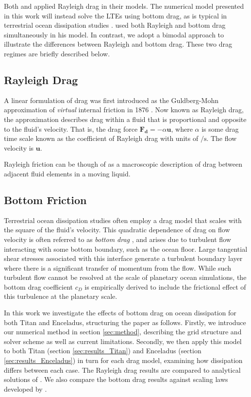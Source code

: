 Both \citet{tyler2011tidal} and \citet{matsuyama2014tidal} applied Rayleigh drag in their models. The numerical model presented in this work will instead solve the LTEs using bottom drag, as is typical in terrestrial ocean dissipation studies \citep{taylor1920tidal,jeffreys1921tidal,zahel1977global,egbert2001estimates,jayne2001parameterizing}. \citet{sears1995tidal} used both Rayleigh and bottom drag simultaneously in his model. In contrast, we adopt a bimodal approach to illustrate the differences between Rayleigh and bottom drag. These two drag regimes are briefly described below.

\subsection{Rayleigh Drag}

A linear formulation of drag was first introduced as the Guldberg-Mohn approximation of \textit{virtual} internal friction in 1876 \citep{neumann1968ocean}. Now known as Rayleigh drag, the approximation describes drag within a fluid that is proportional and opposite to the fluid's velocity. That is, the drag force $\bm{F_d} = -\alpha \bm{u}$, where $\alpha$ is some drag time scale known as the coefficient of Rayleigh drag with units of $\si{\per\second}$. The flow velocity is $\bm{u}$. %

Rayleigh friction can be though of as a macroscopic description of drag between adjacent fluid elements in a moving liquid.

\subsection{Bottom Friction}

Terrestrial ocean dissipation studies often employ a drag model that scales with the square of the fluid's velocity. This quadratic dependence of drag on flow velocity is often referred to as \textit{bottom drag} \citep{gill1982atmosphere}, and arises due to turbulent flow interacting with some bottom boundary, such as the ocean floor. Large tangential shear stresses associated with this interface generate a turbulent boundary layer where there is a significant transfer of momentum from the flow. While such turbulent flow cannot be resolved at the scale of planetary ocean simulations, the bottom drag coefficient $c_D$ is empirically derived to include the frictional effect of this turbulence at the planetary scale.

In this work we investigate the effects of bottom drag on ocean dissipation for both Titan and Enceladus, structuring the paper as follows. Firstly, we introduce our numerical method in section \ref{sec:method}, describing the grid structure and solver scheme as well as current limitations. Secondly, we then apply this model to both Titan (section \ref{sec:results_Titan}) and Enceladus (section \ref{sec:results_Enceladus}) in turn for each drag model, examining how dissipation differs between each case. The Rayleigh drag results are compared to analytical solutions of \citet{matsuyama2014tidal}. We also compare the bottom drag results against scaling laws developed by \citep{chen2013tidal}.




